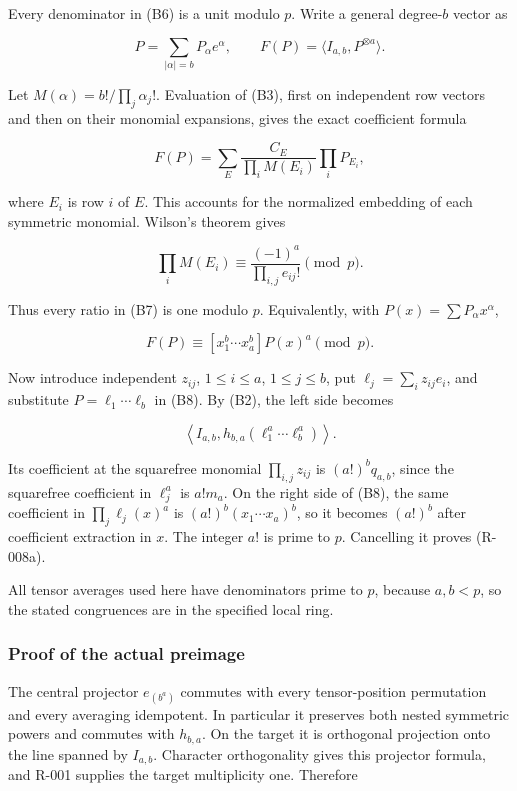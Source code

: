 \documentclass[
  10pt,
]{article}
\begin{document}
Every denominator in (B6) is a unit modulo \(p\). Write a general
degree-\(b\) vector as

\[
 P=\sum_{|\alpha|=b}P_\alpha e^\alpha,
 \qquad
 F(P)=\langle I_{a,b},P^{\otimes a}\rangle.
\]

Let \(M(\alpha)=b!/\prod_j\alpha_j!\). Evaluation of (B3), first on
independent row vectors and then on their monomial expansions, gives the
exact coefficient formula

\[
 F(P)=\sum_E \frac{C_E}{\prod_i M(E_i)}\prod_i P_{E_i},
 \tag{B7}
\]

where \(E_i\) is row \(i\) of \(E\). This accounts for the normalized
embedding of each symmetric monomial. Wilson's theorem gives

\[
 \prod_iM(E_i)\equiv
 \frac{(-1)^a}{\prod_{i,j}e_{ij}!}\pmod p.
\]

Thus every ratio in (B7) is one modulo \(p\). Equivalently, with
\(P(x)=\sum P_\alpha x^\alpha\),

\[
 F(P)\equiv[x_1^b\cdots x_a^b]P(x)^a\pmod p.
 \tag{B8}
\]

Now introduce independent \(z_{ij}\), \(1\le i\le a\), \(1\le j\le b\),
put \(\ell_j=\sum_i z_{ij}e_i\), and substitute \(P=\ell_1\cdots\ell_b\)
in (B8). By (B2), the left side becomes

\[
 \left\langle I_{a,b},h_{b,a}(\ell_1^a\cdots\ell_b^a)\right\rangle.
\]

Its coefficient at the squarefree monomial \(\prod_{i,j}z_{ij}\) is
\((a!)^b q_{a,b}\), since the squarefree coefficient in \(\ell_j^a\) is
\(a!m_a\). On the right side of (B8), the same coefficient in
\(\prod_j\ell_j(x)^a\) is \((a!)^b(x_1\cdots x_a)^b\), so it becomes
\((a!)^b\) after coefficient extraction in \(x\). The integer \(a!\) is
prime to \(p\). Cancelling it proves (R-008a).

All tensor averages used here have denominators prime to \(p\), because
\(a,b<p\), so the stated congruences are in the specified local ring.

\subsubsection{Proof of the actual
preimage}\label{proof-of-the-actual-preimage}

The central projector \(e_{(b^a)}\) commutes with every tensor-position
permutation and every averaging idempotent. In particular it preserves
both nested symmetric powers and commutes with \(h_{b,a}\). On the
target it is orthogonal projection onto the line spanned by \(I_{a,b}\).
Character orthogonality gives this projector formula, and R-001 supplies
the target multiplicity one. Therefore
\end{document}
